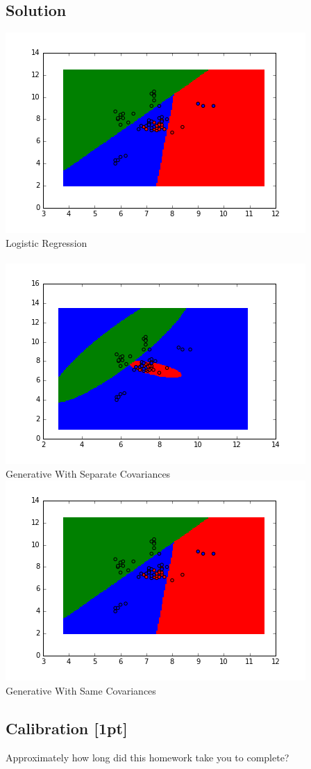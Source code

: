 \documentclass[submit]{harvardml}
\begin{document}
\subsection*{Solution}
\includegraphics{logistic_regression_result}\\
Logistic Regression\\
\\
\includegraphics{generative_result_separate_covariances}\\
Generative With Separate Covariances\\
\includegraphics{logistic_regression_result}\\
Generative With Same Covariances








\newpage
\subsection*{Calibration [1pt]}
Approximately how long did this homework take you to complete?
\end{document}
